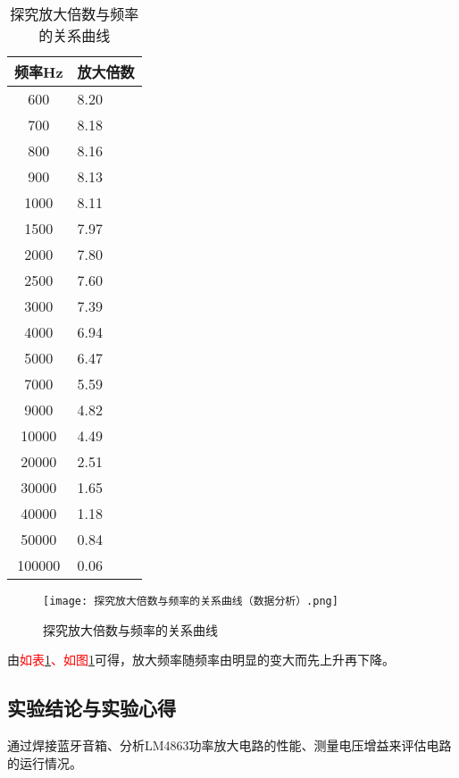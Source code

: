 \documentclass[dvipsnames, svgnames,a4paper,11pt]{article}
\begin{document}
\begin{table}[ht]
\begin{multicols}{2}
				\begin{tabularx}{\columnwidth}{|c|X|}
					\hline
					频率Hz & 放大倍数  \\
					\hline
					600 & 8.20  \\ \hline
					700 & 8.18  \\ \hline
					800 & 8.16  \\ \hline
					900 & 8.13  \\ \hline
					1000 & 8.11  \\ \hline
					1500 & 7.97  \\ \hline
					2000 & 7.80  \\ \hline
					2500 & 7.60  \\ \hline
					3000 & 7.39  \\ \hline
					4000 & 6.94  \\ \hline
					5000 & 6.47  \\ \hline
					7000 & 5.59  \\ \hline
					9000 & 4.82  \\ \hline
					10000 & 4.49  \\ \hline
					20000 & 2.51  \\ \hline
					30000 & 1.65  \\ \hline
					40000 & 1.18  \\ \hline
					50000 & 0.84  \\ \hline
					100000 & 0.06  \\ \hline
				\end{tabularx}
			\end{multicols}
			\caption{探究放大倍数与频率的关系曲线}
			\label{tab:探究放大倍数与频率的关系曲线}
		\end{table}

		\begin{figure}[htbp]
			\centering
			\texttt{[image: 探究放大倍数与频率的关系曲线（数据分析）.png]}
			\caption{探究放大倍数与频率的关系曲线}
			\label{fig:探究放大倍数与频率的关系曲线}
		\end{figure}
		由\textcolor{red}{如表\ref{tab:探究放大倍数与频率的关系曲线}、如图\ref{fig:探究放大倍数与频率的关系曲线}}可得，放大频率随频率由明显的变大而先上升再下降。



	

\clearpage
\subsection{实验结论与实验心得}
通过焊接蓝牙音箱、分析LM4863功率放大电路的性能、测量电压增益来评估电路的运行情况。
\end{document}
